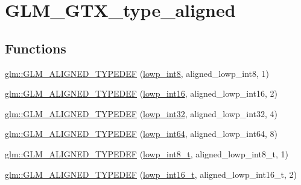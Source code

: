 \hypertarget{group__gtx__type__aligned}{}\section{G\+L\+M\+\_\+\+G\+T\+X\+\_\+type\+\_\+aligned}
\label{group__gtx__type__aligned}
\subsection*{Functions}
\begin{DoxyCompactItemize}
\item 
\mbox{\hyperlink{group__gtx__type__aligned_gab5cd5c5fad228b25c782084f1cc30114}{glm\+::\+G\+L\+M\+\_\+\+A\+L\+I\+G\+N\+E\+D\+\_\+\+T\+Y\+P\+E\+D\+EF}} (\mbox{\hyperlink{group__gtc__type__precision_gaf9e675b6392764242ae87eb179e9d3d6}{lowp\+\_\+int8}}, aligned\+\_\+lowp\+\_\+int8, 1)
\item 
\mbox{\hyperlink{group__gtx__type__aligned_ga5bb5dd895ef625c1b113f2cf400186b0}{glm\+::\+G\+L\+M\+\_\+\+A\+L\+I\+G\+N\+E\+D\+\_\+\+T\+Y\+P\+E\+D\+EF}} (\mbox{\hyperlink{group__gtc__type__precision_ga71fc0c399fa4780507748b643733f153}{lowp\+\_\+int16}}, aligned\+\_\+lowp\+\_\+int16, 2)
\item 
\mbox{\hyperlink{group__gtx__type__aligned_gac6efa54cf7c6c86f7158922abdb1a430}{glm\+::\+G\+L\+M\+\_\+\+A\+L\+I\+G\+N\+E\+D\+\_\+\+T\+Y\+P\+E\+D\+EF}} (\mbox{\hyperlink{group__gtc__type__precision_gad9939c9d6fec1c6accc02a83c6500f08}{lowp\+\_\+int32}}, aligned\+\_\+lowp\+\_\+int32, 4)
\item 
\mbox{\hyperlink{group__gtx__type__aligned_ga6612eb77c8607048e7552279a11eeb5f}{glm\+::\+G\+L\+M\+\_\+\+A\+L\+I\+G\+N\+E\+D\+\_\+\+T\+Y\+P\+E\+D\+EF}} (\mbox{\hyperlink{group__gtc__type__precision_gab8a8e75af347592406e41b3ae2c0712b}{lowp\+\_\+int64}}, aligned\+\_\+lowp\+\_\+int64, 8)
\item 
\mbox{\hyperlink{group__gtx__type__aligned_ga7ddc1848ff2223026db8968ce0c97497}{glm\+::\+G\+L\+M\+\_\+\+A\+L\+I\+G\+N\+E\+D\+\_\+\+T\+Y\+P\+E\+D\+EF}} (\mbox{\hyperlink{group__gtc__type__precision_gae6092311f6970a305c2df19a372360a3}{lowp\+\_\+int8\+\_\+t}}, aligned\+\_\+lowp\+\_\+int8\+\_\+t, 1)
\item 
\mbox{\hyperlink{group__gtx__type__aligned_ga22240dd9458b0f8c11fbcc4f48714f68}{glm\+::\+G\+L\+M\+\_\+\+A\+L\+I\+G\+N\+E\+D\+\_\+\+T\+Y\+P\+E\+D\+EF}} (\mbox{\hyperlink{group__gtc__type__precision_gae34c3d53c4c1434fc9f26538b0185667}{lowp\+\_\+int16\+\_\+t}}, aligned\+\_\+lowp\+\_\+int16\+\_\+t, 2)

\end{DoxyCompactItemize}
